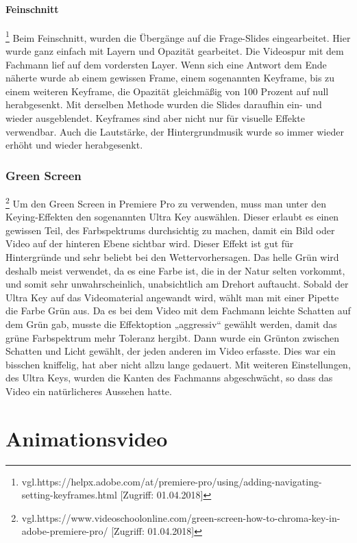 \subsubsection{Feinschnitt}
\footnote{\label{} vgl.https://helpx.adobe.com/at/premiere-pro/using/adding-navigating-setting-keyframes.html [Zugriff: 01.04.2018]} 
Beim Feinschnitt, wurden die Übergänge auf die Frage-Slides eingearbeitet. Hier wurde ganz einfach mit Layern und Opazität gearbeitet. Die Videospur mit dem Fachmann lief auf dem vordersten Layer. Wenn sich eine Antwort dem Ende näherte wurde ab einem gewissen Frame, einem sogenannten Keyframe, bis zu einem weiteren Keyframe, die Opazität gleichmäßig von 100 Prozent auf null herabgesenkt. Mit derselben Methode wurden die Slides daraufhin ein- und wieder ausgeblendet. Keyframes sind aber nicht nur für visuelle Effekte verwendbar. Auch die Lautstärke, der Hintergrundmusik wurde so immer wieder erhöht und wieder herabgesenkt.

\subsection{Green Screen}
\footnote{\label{} vgl.https://www.videoschoolonline.com/green-screen-how-to-chroma-key-in-adobe-premiere-pro/ [Zugriff: 01.04.2018]} 
Um den Green Screen in Premiere Pro zu verwenden, muss man unter den Keying-Effekten den sogenannten Ultra Key auswählen. Dieser erlaubt es einen gewissen Teil, des Farbspektrums durchsichtig zu machen, damit ein Bild oder Video auf der hinteren Ebene sichtbar wird. Dieser Effekt ist gut für Hintergründe und sehr beliebt bei den Wettervorhersagen. Das helle Grün wird deshalb meist verwendet, da es eine Farbe ist, die in der Natur selten vorkommt, und somit sehr unwahrscheinlich, unabsichtlich am Drehort auftaucht. Sobald der Ultra Key auf das Videomaterial angewandt wird, wählt man mit einer Pipette die Farbe Grün aus. Da es bei dem Video mit dem Fachmann leichte Schatten auf dem Grün gab, musste die Effektoption „aggressiv“ gewählt werden, damit das grüne Farbspektrum mehr Toleranz hergibt. Dann wurde ein Grünton zwischen Schatten und Licht gewählt, der jeden anderen im Video erfasste. Dies war ein bisschen kniffelig, hat aber nicht allzu lange gedauert. Mit weiteren Einstellungen, des Ultra Keys, wurden die Kanten des Fachmanns abgeschwächt, so dass das Video ein natürlicheres Aussehen hatte.



\chapter{Animationsvideo}

